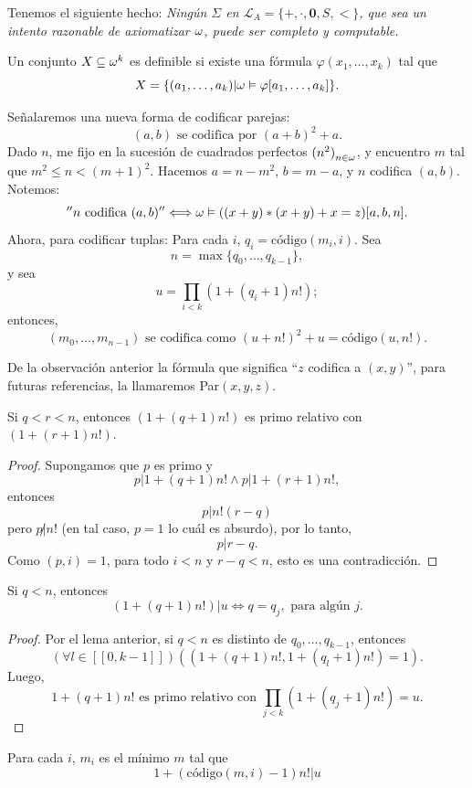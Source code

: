 Tenemos el siguiente hecho:
\textit{Ningún $\Sigma$ en $\mathcal{L}_A=\{+,\cdot,\mathbf{0},S,<\}$, que sea un intento razonable de axiomatizar $\omega$, puede ser completo y computable.}

\begin{defn} {\label{definiblexd}}
    Un conjunto $X\subseteq\omega^k$ es definible si existe una fórmula $\varphi(x_1,\ldots,x_k)$ tal que
    \[X=\{(a_1,\ldots,a_k)|\omega\vDash\varphi[a_1,\ldots,a_k]\}.\]
\end{defn}

\begin{obs}
    Señalaremos una nueva forma de codificar parejas:
    \[(a,b)\text{ se codifica por }(a+b)^2+a.\]
    Dado $n$, me fijo en la sucesión de cuadrados perfectos ${(n^2)}_{n\in\omega}$, y encuentro $m$ tal que $m^2\leq n<{(m+1)}^2$. Hacemos $a=n-m^2$, $b=m-a$, y $n$ codifica $(a,b)$. Notemos:
    \[''n\text{ codifica }(a,b)''\Longleftrightarrow \omega\vDash ((x+y)*(x+y)+x=z)[a,b,n].\]
    Ahora, para codificar tuplas:
    Para cada $i$, $q_i=\text{código}(m_i,i)$. Sea
    \[n=\max\{q_0,\ldots,q_{k-1}\},\]
    y sea
    \[u=\prod_{i<k}(1+(q_i+1)n!);\]
    entonces,
    \[(m_0,\ldots,m_{n-1})\text{ se codifica como }(u+n!)^2+u=\text{código}(u,n!).\]
\end{obs}
De la observación anterior la fórmula que significa ``$z$ codifica a $(x,y)$'', para futuras referencias, la llamaremos Par$(x,y,z)$.
\begin{lem}
    Si $q<r<n$, entonces $(1+(q+1)n!)$ es primo relativo con $(1+(r+1)n!)$.
\end{lem}
\begin{proof}
    Supongamos que $p$ es primo y
    \[p|1+(q+1)n!\land p|1+(r+1)n!,\]
    entonces
    \[p|n!(r-q)\]
    pero $p\not|n!$ (en tal caso, $p=1$ lo cuál es absurdo), por lo tanto,
    \[p|r-q.\]
    Como $(p,i)=1$, para todo $i<n$ y $r-q<n$, esto es una contradicción.
\end{proof}
\begin{lem}
    Si $q<n$, entonces
    \[(1+(q+1)n!)|u\Longleftrightarrow q=q_j,\text{ para algún }j.\]
\end{lem}
\begin{proof}
    Por el lema anterior, si $q<n$ es distinto de $q_0,\ldots,q_{k-1}$, entonces
    \[(\forall l\in[[0,k-1]])((1+(q+1)n!,1+(q_l+1)n!)=1).\]
    Luego, 
    \[1+(q+1)n!\text{ es primo relativo con } \prod_{j<k}(1+(q_j+1)n!)=u.\]
\end{proof}
\begin{lem}
    Para cada $i$, $m_i$ es el mínimo $m$ tal que
    \begin{equation}\tag{R}\label{R}
        1+(\text{código}(m,i)-1)n!|u
    \end{equation}
\end{lem}

